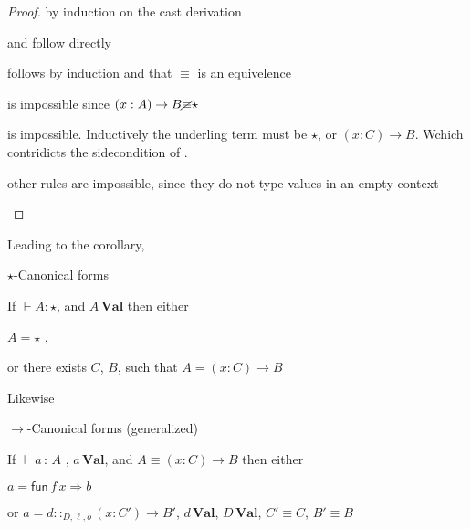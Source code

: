 \begin{proof}
by induction on the cast derivation

\begin{casenv}
  \item {} and  follow directly
  \item {} follows by induction and that $\equiv$ is an equivelence 
  \item {} is impossible since $\left(x:A\right)\rightarrow B\cancel{\equiv}\star$
  \item {} is impossible.
    Inductively the underling term must be $\star$, or $\left(x:C\right)\rightarrow B$.
    Wchich contridicts the sidecondition of .
  \item other rules are impossible, since they do not type values in an empty context
\end{casenv}
\end{proof}
Leading to the corollary,
\begin{cor}
$\star$-Canonical forms

If $\vdash A:\star$, and $A\,\textbf{Val}$ then either 

\textup{$A=\star$ , }

\textup{or there exists $C$, $B$, such that $A=\left(x:C\right)\rightarrow B$}
\end{cor}

Likewise
\begin{lem}
$\rightarrow$-Canonical forms (generalized)

If $\vdash a\,:\,A$ , $a\,\textbf{Val}$, and $A\equiv\left(x:C\right)\rightarrow B$
then either

$a=\mathsf{fun}\,f\,x\Rightarrow b$ 

or $a=d::_{D,\ell ,o}\left(x:C'\right)\rightarrow B'$, $d\,\textbf{Val}$, $D\,\textbf{Val}$, $C'\equiv C$, $B'\equiv B$ 
\end{lem}


